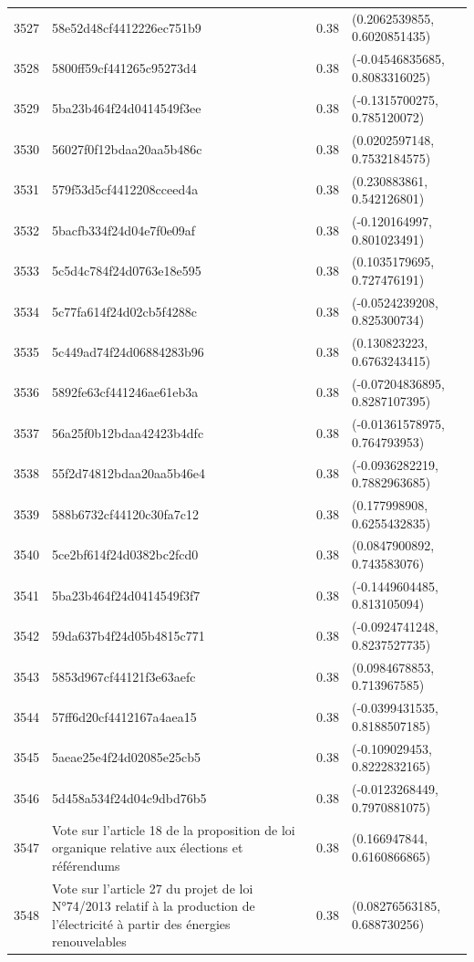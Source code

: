\begin{table}[ht]
\begin{tabular}{rlrl}
  3527 & 58e52d48cf4412226ec751b9 & 0.38 & (0.2062539855, 0.6020851435) \\ 
  3528 & 5800ff59cf441265c95273d4 & 0.38 & (-0.04546835685, 0.8083316025) \\ 
  3529 & 5ba23b464f24d0414549f3ee & 0.38 & (-0.1315700275, 0.785120072) \\ 
  3530 & 56027f0f12bdaa20aa5b486c & 0.38 & (0.0202597148, 0.7532184575) \\ 
  3531 & 579f53d5cf4412208cceed4a & 0.38 & (0.230883861, 0.542126801) \\ 
  3532 & 5bacfb334f24d04e7f0e09af & 0.38 & (-0.120164997, 0.801023491) \\ 
  3533 & 5c5d4c784f24d0763e18e595 & 0.38 & (0.1035179695, 0.727476191) \\ 
  3534 & 5c77fa614f24d02cb5f4288c & 0.38 & (-0.0524239208, 0.825300734) \\ 
  3535 & 5c449ad74f24d06884283b96 & 0.38 & (0.130823223, 0.6763243415) \\ 
  3536 & 5892fe63cf441246ae61eb3a & 0.38 & (-0.07204836895, 0.8287107395) \\ 
  3537 & 56a25f0b12bdaa42423b4dfc & 0.38 & (-0.01361578975, 0.764793953) \\ 
  3538 & 55f2d74812bdaa20aa5b46e4 & 0.38 & (-0.0936282219, 0.7882963685) \\ 
  3539 & 588b6732cf44120c30fa7c12 & 0.38 & (0.177998908, 0.6255432835) \\ 
  3540 & 5ce2bf614f24d0382bc2fcd0 & 0.38 & (0.0847900892, 0.743583076) \\ 
  3541 & 5ba23b464f24d0414549f3f7 & 0.38 & (-0.1449604485, 0.813105094) \\ 
  3542 & 59da637b4f24d05b4815c771 & 0.38 & (-0.0924741248, 0.8237527735) \\ 
  3543 & 5853d967cf44121f3e63aefc & 0.38 & (0.0984678853, 0.713967585) \\ 
  3544 & 57ff6d20cf4412167a4aea15 & 0.38 & (-0.0399431535, 0.8188507185) \\ 
  3545 & 5aeae25e4f24d02085e25cb5 & 0.38 & (-0.109029453, 0.8222832165) \\ 
  3546 & 5d458a534f24d04c9dbd76b5 & 0.38 & (-0.0123268449, 0.7970881075) \\ 
  3547 & Vote sur l'article 18 de la proposition de loi organique relative aux élections et référendums & 0.38 & (0.166947844, 0.6160866865) \\ 
  3548 & Vote sur l'article 27 du projet de loi N°74/2013 relatif à la production de l'électricité à partir des énergies renouvelables & 0.38 & (0.08276563185, 0.688730256) \\ 

\end{tabular}
\end{table}
